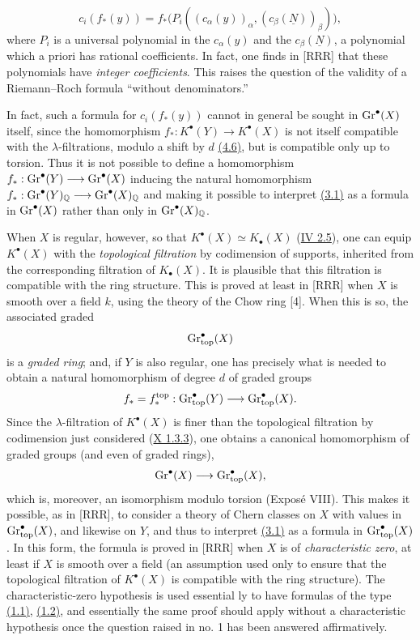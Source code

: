 \begin{equation}\tag{3.1}
  c_i(f_*(y))
  =f_*\bigl(P_i((c_\alpha(y))_\alpha,(c_\beta(\underline N))_\beta)\bigr),
\end{equation}
where $P_i$ is a universal polynomial in the $c_\alpha(y)$ and the $c_\beta(\underline N)$, a polynomial which a priori has rational coefficients. In fact, one finds in [RRR] that these polynomials have \emph{integer coefficients}. This raises the question of the validity of a Riemann--Roch formula ``without denominators.''

In fact, such a formula for $c_i(f_*(y))$ cannot in general be sought in $\operatorname{Gr}^\bullet(X)$ itself, since the homomorphism $f_*:K^\bullet(Y)\longrightarrow K^\bullet(X)$ is not itself compatible with the $\lambda$-filtrations, modulo a shift by $d$ \hyperlink{sga6.e14.para.4-6}{(4.6)}, but is compatible only up to torsion. Thus it is not possible to define a homomorphism $f_*:\operatorname{Gr}^\bullet(Y)\longrightarrow\operatorname{Gr}^\bullet(X)$ inducing the natural homomorphism $f_*:\operatorname{Gr}^\bullet(Y)_{\mathbb Q}\longrightarrow\operatorname{Gr}^\bullet(X)_{\mathbb Q}$ and making it possible to interpret \hyperlink{sga6.e14.eq.3-1}{(3.1)} as a formula in $\operatorname{Gr}^\bullet(X)$ rather than only in $\operatorname{Gr}^\bullet(X)_{\mathbb Q}$.

When $X$ is regular, however, so that $K^\bullet(X)\simeq K_\bullet(X)$ (\hyperlink{sga6.e04.para.2-5}{IV 2.5}), one can equip $K^\bullet(X)$ with the \emph{topological filtration} by codimension of supports, inherited from the corresponding filtration of $K_\bullet(X)$. It is plausible that this filtration is compatible with the ring structure. This is proved at least in [RRR] when $X$ is smooth over a field $k$, using the theory of the Chow ring [4]. When this is so, the associated graded
\[
  \operatorname{Gr}_{\mathrm{top}}^\bullet(X)
\]
is a \emph{graded ring}; and, if $Y$ is also regular, one has precisely what is needed to obtain a natural homomorphism of degree $d$ of graded groups
\[
  f_*=f_*^{\mathrm{top}}:\operatorname{Gr}_{\mathrm{top}}^\bullet(Y)
  \longrightarrow\operatorname{Gr}_{\mathrm{top}}^\bullet(X).
\]
Since the $\lambda$-filtration of $K^\bullet(X)$ is finer than the topological filtration by codimension just considered (\hyperlink{sga6.e10.cor.1-3-3}{X 1.3.3}), one obtains a canonical homomorphism of graded groups (and even of graded rings),
\[
  \operatorname{Gr}^\bullet(X)\longrightarrow\operatorname{Gr}_{\mathrm{top}}^\bullet(X),
\]
which is, moreover, an isomorphism modulo torsion (Expos\'e VIII). This makes it possible, as in [RRR], to consider a theory of Chern classes on $X$ with values in $\operatorname{Gr}_{\mathrm{top}}^\bullet(X)$, and likewise on $Y$, and thus to interpret \hyperlink{sga6.e14.eq.3-1}{(3.1)} as a formula in $\operatorname{Gr}_{\mathrm{top}}^\bullet(X)$. In this form, the formula is proved in [RRR] when $X$ is of \emph{characteristic zero}, at least if $X$ is smooth over a field (an assumption used only to ensure that the topological filtration of $K^\bullet(X)$ is compatible with the ring structure). The characteristic-zero hypothesis is used essential%
ly to have formulas of the type \hyperlink{sga6.e14.eq.1-1}{(1.1)}, \hyperlink{sga6.e14.eq.1-2}{(1.2)}, and essentially the same proof should apply without a characteristic hypothesis once the question raised in no. 1 has been answered affirmatively.

